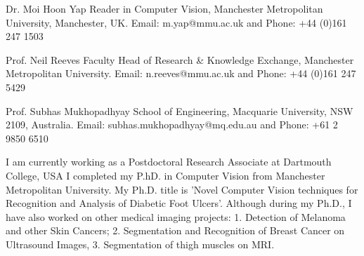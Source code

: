 \documentclass[10pt,a4paper]{article} %
\begin{document}
	
	\spacedhrule{1.6em}{-0.4em} %
	
	
	\inlineheadsection %
	{Dr. Moi Hoon Yap}
	{Reader in Computer Vision, Manchester Metropolitan University, Manchester, UK.
	Email: m.yap@mmu.ac.uk and Phone: +44 (0)161 247 1503}
	
	\inlineheadsection %
	{Prof. Neil Reeves}
	{Faculty Head of Research \& Knowledge Exchange, Manchester Metropolitan University. Email: n.reeves@mmu.ac.uk and Phone: +44 (0)161 247 5429}
	
	\inlineheadsection %
	{Prof. Subhas Mukhopadhyay}
	{School of Engineering, Macquarie University, NSW 2109, Australia. Email: subhas.mukhopadhyay@mq.edu.au and Phone: +61 2 9850 6510}
	
	\spacedhrule{1.6em}{0.8em} %
	
	
	
	
	\inlineheadsection 
	{I am currently working as a Postdoctoral Research Associate at Dartmouth College, USA} {I completed my P.hD. in Computer Vision from Manchester Metropolitan University. My Ph.D. title is 'Novel Computer Vision techniques for Recognition and Analysis of Diabetic Foot Ulcers'. Although during my Ph.D., I have also worked on other medical imaging projects: 1. Detection of Melanoma and other Skin Cancers; 2. Segmentation and Recognition of Breast Cancer on Ultrasound Images, 3. Segmentation of thigh muscles on MRI.} 
	
	
	
	
\end{document}
